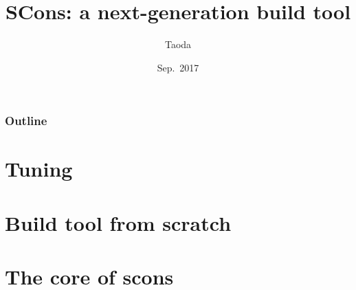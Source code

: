 \documentclass[lualatex]{beamer}
\title[SCons]{SCons: a next-generation build tool}
\author{Taoda}
\institute{Alibaba Cloud}
\date{Sep.\ 2017}
\begin{document}
\begin{frame}
\titlepage
\end{frame}

\begin{frame}
  \frametitle{Outline}
  \tableofcontents
\end{frame}

\section{Tuning}
\section{Build tool from scratch}
\section{The core of scons}
\end{document}
